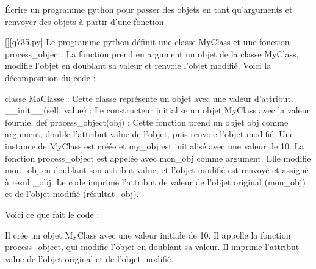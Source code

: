         \question
        Écrire un programme python pour passer des objets en tant qu'arguments et renvoyer des objets à partir d'une fonction
        \par
        \begin{solution}
            \renewcommand{\nomfichier}{q735.py}
            \pythonfile{\chemincode \nomfichier}[][\nomfichier]
            Le programme python définit une classe MyClass et une fonction process\_object. La fonction prend en argument un objet de la classe MyClass, modifie l'objet en doublant sa valeur et renvoie l'objet modifié. Voici la décomposition du code :

    classe MaClasse : Cette classe représente un objet avec une valeur d'attribut.
    \_\_init\_\_(self, value) : Le constructeur initialise un objet MyClass avec la valeur fournie.
    def process\_object(obj) : Cette fonction prend un objet obj comme argument, double l'attribut value de l'objet, puis renvoie l'objet modifié.
    Une instance de MyClass est créée et my\_obj est initialisé avec une valeur de 10.
    La fonction process\_object est appelée avec mon\_obj comme argument. Elle modifie mon\_obj en doublant son attribut value, et l'objet modifié est renvoyé et assigné à result\_obj.
    Le code imprime l'attribut de valeur de l'objet original (mon\_obj) et de l'objet modifié (résultat\_obj).

Voici ce que fait le code :

    Il crée un objet MyClass avec une valeur initiale de 10.
    Il appelle la fonction process\_object, qui modifie l'objet en doublant sa valeur.
    Il imprime l'attribut value de l'objet original et de l'objet modifié.
        \end{solution}
        

